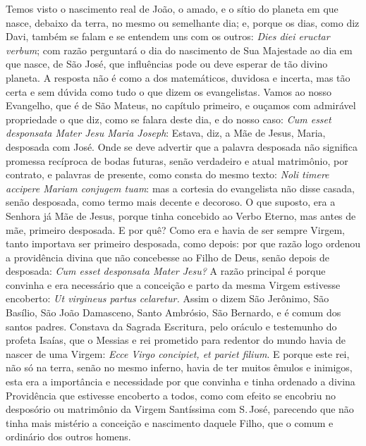 Temos visto o nascimento real de João, o amado, e o sítio do planeta em
que nasce, debaixo da terra, no mesmo ou semelhante dia; e, porque os
dias, como diz Davi, também se falam e se entendem uns com os outros:
\emph{Dies diei eructar verbum}; com razão perguntará o dia do
nascimento de Sua Majestade ao dia em que nasce, de São José, que
influências pode ou deve esperar de tão divino planeta. A resposta não é
como a dos matemáticos, duvidosa e incerta, mas tão certa e sem dúvida
como tudo o que dizem os evangelistas. Vamos ao nosso Evangelho, que é
de São Mateus, no capítulo primeiro, e ouçamos com admirável propriedade
o que diz, como se falara deste dia, e do nosso caso: \emph{Cum esset
desponsata Mater Jesu Maria Joseph}: Estava, diz, a Mãe de
Jesus, Maria, desposada com José. Onde se deve advertir que a palavra
desposada não significa promessa recíproca de bodas futuras, senão
verdadeiro e atual matrimônio, por contrato, e palavras de presente,
como consta do mesmo texto: \emph{Noli timere accipere Mariam conjugem
tuam}: mas a cortesia do evangelista não disse casada, senão
desposada, como termo mais decente e decoroso. O que suposto, era a
Senhora já Mãe de Jesus, porque tinha concebido ao Verbo Eterno, mas
antes de mãe, primeiro desposada. E por quê? Como era e havia de ser
sempre Virgem, tanto importava ser primeiro desposada, como depois: por
que razão logo ordenou a providência divina que não concebesse ao Filho
de Deus, senão depois de desposada: \emph{Cum esset desponsata Mater
Jesu?} A razão principal é porque convinha e era necessário que a
conceição e parto da mesma Virgem estivesse encoberto: \emph{Ut
virgineus partus celaretur.} Assim o dizem São Jerônimo, São Basílio,
São João Damasceno, Santo Ambrósio, São Bernardo, e é comum dos santos
padres. Constava da Sagrada Escritura, pelo oráculo e testemunho do
profeta Isaías, que o Messias e rei prometido para redentor do mundo
havia de nascer de uma Virgem: \emph{Ecce Virgo concipiet, et pariet
filium}. E porque este rei, não só na terra, senão no mesmo
inferno, havia de ter muitos êmulos e inimigos, esta era a importância e
necessidade por que convinha e tinha ordenado a divina Providência que
estivesse encoberto a todos, como com efeito se encobriu no desposório
ou matrimônio da Virgem Santíssima com S.\,José, parecendo que não tinha
mais mistério a conceição e nascimento daquele Filho, que o comum e
ordinário dos outros homens.

